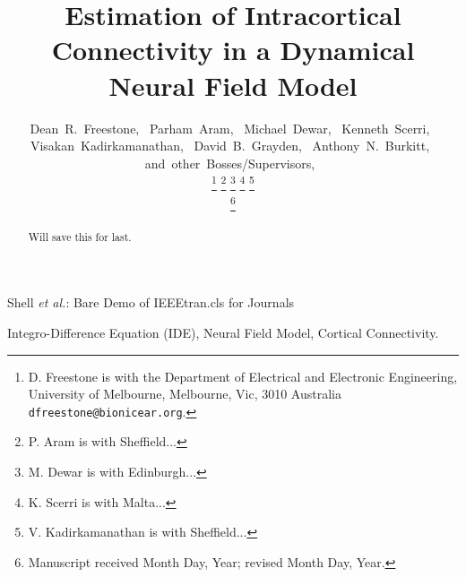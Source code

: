 \documentclass[onecolumn,draftcls]{IEEEtran}
\begin{document}
\title{Estimation of Intracortical Connectivity in a Dynamical Neural Field Model}

\author{Dean~R.~Freestone,~
        Parham~Aram,~
        Michael~Dewar,~
        Kenneth~Scerri,~
        Visakan~Kadirkamanathan,~
        David~B.~Grayden,~
        Anthony~N.~Burkitt,~
        and~other~Bosses/Supervisors,~%

\thanks{D. Freestone is with the Department
of Electrical and Electronic Engineering, University of Melbourne, Melbourne,
Vic, 3010 Australia {\tt\small dfreestone@bionicear.org}.}%
\thanks{P. Aram is with Sheffield...}
\thanks{M. Dewar is with Edinburgh...}
\thanks{K. Scerri is with Malta...}
\thanks{V. Kadirkamanathan is with Sheffield...}

\thanks{Manuscript received Month Day, Year; revised Month Day, Year.}}


%
{Shell \MakeLowercase{\textit{et al.}}: Bare Demo of IEEEtran.cls for Journals}

\maketitle

\begin{abstract}
Will save this for last.
\end{abstract}


\begin{IEEEkeywords}
Integro-Difference Equation (IDE), Neural Field Model, Cortical Connectivity.
\end{IEEEkeywords}

\IEEEpeerreviewmaketitle
\end{document}
